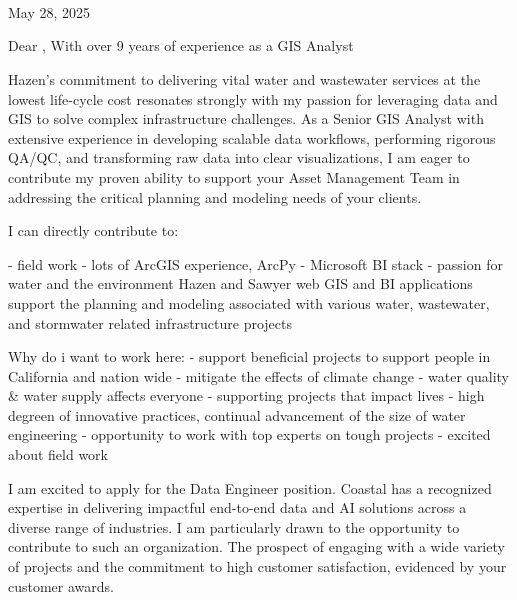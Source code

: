 \documentclass[letterpaper]{article}
\begin{document}
\large
\JobManager \\
\JobManagerTitle \\
\textbf{\JobCompany} \\

\null\hfill May 28, 2025

Dear \JobManagerShort,
With over 9 years of experience as a GIS Analyst

Hazen's commitment to delivering vital water and wastewater services at the
lowest life-cycle cost resonates strongly with my passion for leveraging data
and GIS to solve complex infrastructure challenges. As a Senior GIS Analyst
with extensive experience in developing scalable data workflows, performing
rigorous QA/QC, and transforming raw data into clear visualizations, I am eager
to contribute my proven ability to support your Asset Management Team in
addressing the critical planning and modeling needs of your clients.


I can directly contribute to:

- field work
- lots of ArcGIS experience, ArcPy
- Microsoft BI stack
- passion for water and the environment
Hazen and Sawyer
web GIS and BI applications
support the planning and modeling associated with various water, wastewater, and stormwater related infrastructure projects


Why do i want to work here:
- support beneficial projects to support people in California and nation wide
- mitigate the effects of climate change
- water quality \& water supply affects everyone
- supporting projects that impact lives
- high degreen of innovative practices, continual advancement of the size of water engineering
- opportunity to work with top experts on tough projects
- excited about field work



I am excited to apply for the Data Engineer position.
Coastal has a recognized expertise in delivering impactful end-to-end data and
AI solutions across a diverse range of industries. I am particularly drawn to
the opportunity to contribute to such an organization. The prospect of engaging
with a wide variety of projects and the commitment to high customer
satisfaction, evidenced by your customer awards.
\end{document}
